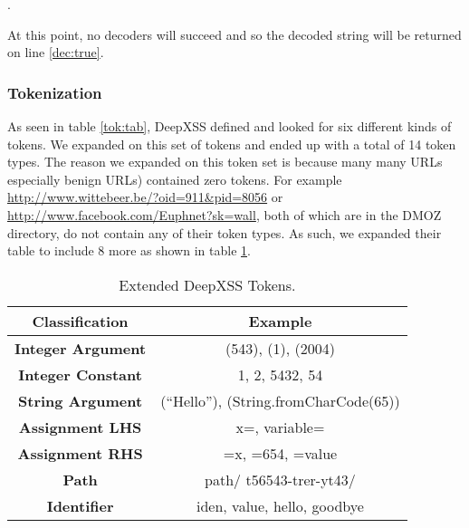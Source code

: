 . 

At this point, no decoders will succeed and so the decoded string will be returned on line \ref{dec:true}.


\subsubsection{Tokenization}
As seen in table \ref{tok:tab}, DeepXSS defined and looked for six different kinds of tokens. We expanded on this set of tokens and ended up with a total of 14 token types. The reason we expanded on this token set is because many many URLs especially benign URLs) contained zero tokens. For example \url{http://www.wittebeer.be/?oid=911\&pid=8056} or \url{http://www.facebook.com/Euphnet?sk=wall}, both of which are in the DMOZ directory, do not contain any of their token types. As such, we expanded their table to include 8 more as shown in table \ref{exp:tok:tab}.


\begin{table}
\begin{center}
\begingroup
\setlength{\tabcolsep}{5pt} %
\renewcommand{\arraystretch}{1.5} %
\begin{tabular}{||c | c||} 
    \hline
    Classification & Example \\ [0.5ex] 
    \hline\hline
    \textbf{Integer Argument} &  (543), (1), (2004) \\ 
    \hline
    \textbf{Integer Constant} &  1, 2, 5432, 54 \\ 
    \hline
    \textbf{String Argument} & (``Hello''), (String.fromCharCode(65)) \\
    \hline
    \textbf{Assignment LHS} & x=, variable= \\
    \hline
    \textbf{Assignment RHS} & =x, =654, =value \\
    \hline
    \textbf{Path} & path/ t56543-trer-yt43/ \\ 
    \hline
    \textbf{Identifier} & iden, value, hello, goodbye \\ [1ex] 
    \hline
\end{tabular}
\endgroup
\caption{\label{exp:tok:tab}Extended DeepXSS Tokens.}
\end{center}
\end{table}

